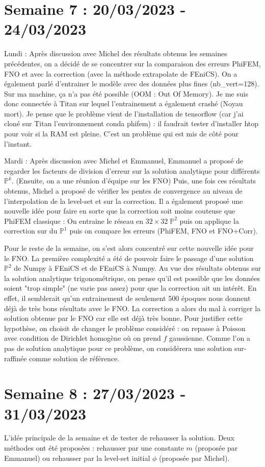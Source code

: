 \documentclass[french]{article}
\begin{document}
\section{Semaine 7 : 20/03/2023 - 24/03/2023}
	Lundi : Après discussion avec Michel des résultats obtenus les semaines précédentes, on a décidé de se concentrer sur la comparaison des erreurs PhiFEM, FNO et avec la correction (avec la méthode extrapolate de FEniCS). On a également parlé d'entrainer le modèle avec des données plus fines (nb\_vert=128). Sur ma machine, ça n'a pas été possible (OOM : Out Of Memory). Je me suis donc connectée à Titan sur lequel l'entrainement a également crashé (Noyau mort). Je pense que le problème vient de l'installation de tensorflow (car j'ai cloné sur Titan l'environnement conda phifem) : il faudrait tester d'installer htop pour voir si la RAM est pleine. C'est un problème qui est mis de côté pour l'instant.
	
	Mardi : Après discussion avec Michel et Emmanuel, Emmanuel a proposé de regarder les facteurs de division d'erreur sur la solution analytique pour différents $\mathbb{P}^k$. (Ensuite, on a une réunion d'équipe sur les FNO) Puis, une fois ces résultats obtenus, Michel a proposé de vérifier les pentes de convergence au niveau de l'interpolation de la level-set et sur la correction. Il a également proposé une nouvelle idée pour faire en sorte que la correction soit moins couteuse que PhiFEM classique : On entraine le réseau en $32\times 32 \; \mathbb{P}^2$ puis on applique la correction sur du $\mathbb{P}^1$ puis on compare les erreurs (PhiFEM, FNO et FNO+Corr).
	
	Pour le reste de la semaine, on s'est alors concentré sur cette nouvelle idée pour le FNO. La première complexité a été de pouvoir faire le passage d'une solution $\mathbb{P}^2$ de Numpy à FEniCS et de FEniCS à Numpy. Au vue des résultats obtenus sur la solution analytique trigonométrique, on pense qu'il est possible que les données soient "trop simple" (ne varie pas assez) pour que la correction ait un intérêt. En effet, il semblerait qu'un entrainement de seulement 500 époques nous donnent déjà de très bons résultats avec le FNO. La correction a alors du mal à corriger la solution obtenue par le FNO car elle est déjà très bonne. Pour justifier cette hypothèse, on choisit de changer le problème considéré : on repasse à Poisson avec condition de Dirichlet homogène où on prend $f$ gaussienne. Comme l'on a pas de solution analytique pour ce problème, on considérera une solution sur-raffinée comme solution de référence. 
\section{Semaine 8 : 27/03/2023 - 31/03/2023}
	L'idée principale de la semaine et de tester de rehausser la solution. Deux méthodes ont été proposées : rehausser par une constante $m$ (proposée par Emmanuel) ou rehausser par la level-set initial $\phi$ (proposée par Michel).
	
\end{document}
